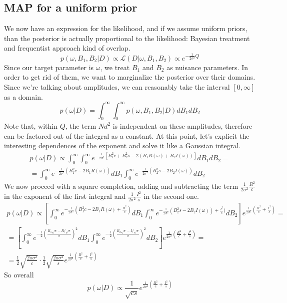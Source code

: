 \documentclass[a4paper,11pt,fleqn]{article}
\begin{document}
\subsection{MAP for a uniform prior}
We now have an expression for the likelihood, and if we assume uniform priors, 
than the posterior is actually proportional to the likelihood: Bayesian 
treatment and frequentist approach kind of overlap. 
\begin{equation}
    p(\omega, B_1, B_2|D) \propto \mathcal{L}(D|\omega, B_1, B_2) \propto e^{-\frac{1}{2\sigma^2}Q}
\end{equation}
Since our target parameter is $\omega$, we treat $B_1$ and $B_2$ as nuisance 
parameters. In order to get rid of them, we want to marginalize the 
posterior over their domains. Since we're talking about amplitudes, we can 
reasonably take the interval $[0,\infty]$ as a domain. 
\begin{equation}
    p(\omega|D) = \int_0^{\infty} \int_0^{\infty}  p(\omega, B_1, B_2|D) dB_1dB_2
\end{equation}
Note that, within $Q$, the term $N\bar{d^2}$ is independent on these 
amplitudes, therefore can be factored out of the integral as a constant.
At this point, let's explicit the interesting dependences of the exponent 
and solve it like a Gaussian integral.
\begin{gather*}
    p(\omega|D) \propto \int_0^{\infty} \int_0^{\infty}   e^{-\frac{1}{2\sigma^2}[B_1^2c + B_2^2 s -2(B_1R(\omega)+B_2I(\omega))]}dB_1dB_2 = \\
    = \int_0^{\infty}e^{-\frac{1}{2\sigma^2}(B_1^2c-2B_1R(\omega))}dB_1 \int_0^{\infty}e^{-\frac{1}{2\sigma^2}(B_2^2s-2B_2I(\omega))}dB_2
\end{gather*}
We now proceed with a square completion, adding and subtracting the term 
$\frac{1}{2\sigma^2}\frac{R^2}{c}$ in the exponent of the first integral and $\frac{1}{2\sigma^2}\frac{I^2}{s}$ in the second one.
\begin{gather*}
    p(\omega|D) \propto \left[\int_0^{\infty}e^{-\frac{1}{2\sigma^2}(B_1^2c-2B_1R(\omega)+\frac{R^2}{c})}dB_1 \int_0^{\infty}e^{-\frac{1}{2\sigma^2}(B_2^2s-2B_2I(\omega))+\frac{I^2}{s})}dB_2\right] e^{\frac{1}{2\sigma^2}\left(\frac{R^2}{c}+\frac{I^2}{s}\right)} =\\
    = \left[\int_0^{\infty} e^{-\frac{1}{2}\left(\frac{B_1\sqrt{c}-R/\sqrt{c}}{\sigma}\right)^2 }dB_1 \int_0^{\infty} e^{-\frac{1}{2}\left(\frac{B_2\sqrt{s}-I/\sqrt{s}}{\sigma}\right)^2 }dB_2\right] e^{\frac{1}{2\sigma^2}\left(\frac{R^2}{c}+\frac{I^2}{s}\right)} = \\
    = \frac{1}{2}\sqrt{\frac{2\pi\sigma^2}{c}} \cdot \frac{1}{2}\sqrt{\frac{2\pi\sigma^2}{s}}e^{\frac{1}{2\sigma^2}\left(\frac{R^2}{c}+\frac{I^2}{s}\right)}
\end{gather*}
So overall
\begin{equation}
    p(\omega|D) \propto \frac{1}{\sqrt{cs}} e^{\frac{1}{2\sigma^2}\left(\frac{R^2}{c}+\frac{I^2}{s}\right)}
\end{equation}
\end{document}
